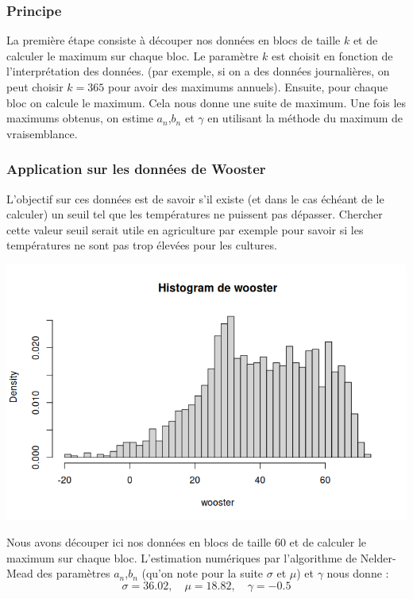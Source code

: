\documentclass{article}
\begin{document}
\subsubsection{Principe}

La première étape consiste à découper nos données en blocs de taille $k$ et de calculer le maximum sur chaque bloc. Le paramètre
$k$ est choisit en fonction de l'interprétation des données. (par exemple, si on a des données journalières, on peut choisir $k=365$ pour avoir des maximums annuels).
Ensuite, pour chaque bloc on calcule le maximum. Cela nous donne une suite de maximum.
Une fois les maximums obtenus, on estime $a_n$,$b_n$ et $\gamma$ en utilisant la méthode du maximum de vraisemblance.

\subsubsection{Application sur les données de Wooster}
L'objectif sur ces données est de savoir s'il existe (et dans le cas échéant de le calculer) un seuil tel que les températures ne puissent pas dépasser.
Chercher cette valeur seuil serait utile en agriculture par exemple pour savoir si les températures ne sont pas trop élevées pour les cultures.

\begin{center}
	\includegraphics[scale=0.8]{./images/woosterhisto.png} 
\end{center}

Nous avons découper ici nos données en blocs de taille $60$ et de calculer le maximum sur chaque bloc.
L'estimation numériques par l'algorithme de Nelder-Mead des paramètres $a_n$,$b_n$  (qu'on note pour la suite $\sigma$ et $\mu$) et $\gamma$ nous donne :
\[
\sigma = 36.02, \quad \mu= 18.82, \quad \gamma = -0.5
\]
\end{document}
